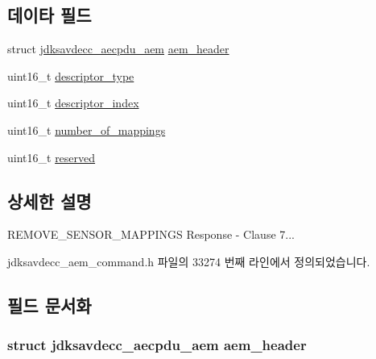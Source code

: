 \subsection*{데이타 필드}
\begin{DoxyCompactItemize}
\item 
struct \hyperlink{structjdksavdecc__aecpdu__aem}{jdksavdecc\+\_\+aecpdu\+\_\+aem} \hyperlink{structjdksavdecc__aem__command__remove__sensor__mappings__response_ae1e77ccb75ff5021ad923221eab38294}{aem\+\_\+header}
\item 
uint16\+\_\+t \hyperlink{structjdksavdecc__aem__command__remove__sensor__mappings__response_ab7c32b6c7131c13d4ea3b7ee2f09b78d}{descriptor\+\_\+type}
\item 
uint16\+\_\+t \hyperlink{structjdksavdecc__aem__command__remove__sensor__mappings__response_a042bbc76d835b82d27c1932431ee38d4}{descriptor\+\_\+index}
\item 
uint16\+\_\+t \hyperlink{structjdksavdecc__aem__command__remove__sensor__mappings__response_ac7db472c5622ef473d5d0a5c416d5531}{number\+\_\+of\+\_\+mappings}
\item 
uint16\+\_\+t \hyperlink{structjdksavdecc__aem__command__remove__sensor__mappings__response_a5a6ed8c04a3db86066924b1a1bf4dad3}{reserved}
\end{DoxyCompactItemize}


\subsection{상세한 설명}
R\+E\+M\+O\+V\+E\+\_\+\+S\+E\+N\+S\+O\+R\+\_\+\+M\+A\+P\+P\+I\+N\+GS Response -\/ Clause 7... 

jdksavdecc\+\_\+aem\+\_\+command.\+h 파일의 33274 번째 라인에서 정의되었습니다.



\subsection{필드 문서화}
\subsubsection[{\texorpdfstring{aem\+\_\+header}{aem_header}}]{\setlength{\rightskip}{0pt plus 5cm}struct {\bf jdksavdecc\+\_\+aecpdu\+\_\+aem} aem\+\_\+header}\hypertarget{structjdksavdecc__aem__command__remove__sensor__mappings__response_ae1e77ccb75ff5021ad923221eab38294}{}\label{structjdksavdecc__aem__command__remove__sensor__mappings__response_ae1e77ccb75ff5021ad923221eab38294}


